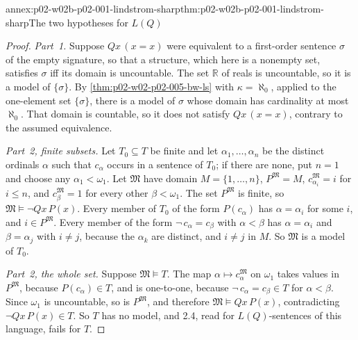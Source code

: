 \begin{annexitem}{annex:p02-w02b-p02-001-lindstrom-sharp}{thm:p02-w02b-p02-001-lindstrom-sharp}{The two hypotheses for \(L(Q)\)}
\begin{proof}
\emph{Part~1.}  Suppose \(Qx\,(x=x)\) were equivalent to a first-order
sentence \(\sigma\) of the empty signature, so that a structure, which here
is a nonempty set, satisfies \(\sigma\) iff its domain is uncountable.  The
set \(\mathbb R\) of reals is uncountable, so it is a model of
\(\{\sigma\}\).  By \cref{thm:p02-w02-p02-005-bw-ls} with
\(\kappa=\aleph_0\), applied to the one-element set \(\{\sigma\}\), there is
a model of \(\sigma\) whose domain has cardinality at most \(\aleph_0\).
That domain is countable, so it does not satisfy \(Qx\,(x=x)\), contrary to
the assumed equivalence.

\emph{Part~2, finite subsets.}  Let \(T_0\subseteq T\) be finite and let
\(\alpha_1,\ldots,\alpha_n\) be the distinct ordinals \(\alpha\) such that
\(c_\alpha\) occurs in a sentence of \(T_0\); if there are none, put
\(n=1\) and choose any \(\alpha_1<\omega_1\).  Let \(\mathfrak M\) have
domain \(M=\{1,\ldots,n\}\), \(P^{\mathfrak M}=M\),
\(c_{\alpha_i}^{\mathfrak M}=i\) for \(i\leq n\), and
\(c_\beta^{\mathfrak M}=1\) for every other \(\beta<\omega_1\).  The set
\(P^{\mathfrak M}\) is finite, so \(\mathfrak M\models\neg Qx\,P(x)\).
Every member of \(T_0\) of the form \(P(c_\alpha)\) has
\(\alpha=\alpha_i\) for some \(i\), and \(i\in P^{\mathfrak M}\).  Every
member of the form \(\neg\,c_\alpha=c_\beta\) with \(\alpha<\beta\) has
\(\alpha=\alpha_i\) and \(\beta=\alpha_j\) with \(i\ne j\), because the
\(\alpha_k\) are distinct, and \(i\ne j\) in \(M\).  So
\(\mathfrak M\) is a model of \(T_0\).

\emph{Part~2, the whole set.}  Suppose \(\mathfrak M\models T\).  The map
\(\alpha\mapsto c_\alpha^{\mathfrak M}\) on \(\omega_1\) takes values in
\(P^{\mathfrak M}\), because \(P(c_\alpha)\in T\), and is one-to-one,
because \(\neg\,c_\alpha=c_\beta\in T\) for \(\alpha<\beta\).  Since
\(\omega_1\) is uncountable, so is \(P^{\mathfrak M}\), and therefore
\(\mathfrak M\models Qx\,P(x)\), contradicting
\(\neg Qx\,P(x)\in T\).  So \(T\) has no model, and 2.4, read for
\(L(Q)\)-sentences of this language, fails for \(T\).
\end{proof}
\end{annexitem}

